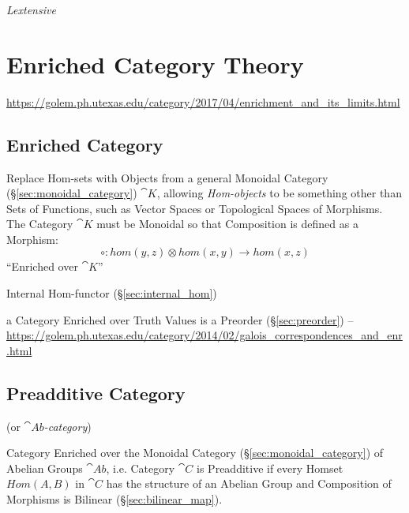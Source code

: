 \emph{Lextensive}



\section{Enriched Category Theory}\label{sec:enriched_category_theory}

\url{https://golem.ph.utexas.edu/category/2017/04/enrichment_and_its_limits.html}



\subsection{Enriched Category}\label{sec:enriched_category}

Replace Hom-sets with Objects from a general Monoidal Category
(\S\ref{sec:monoidal_category}) $\cat{K}$, allowing \emph{Hom-objects}
to be something other than Sets of Functions, such as Vector Spaces or
Topological Spaces of Morphisms. The Category $\cat{K}$ must be
Monoidal so that Composition is defined as a Morphism:
\[
  \circ : hom(y,z) \otimes hom(x,y) \rightarrow hom(x,z)
\]
``Enriched over $\cat{K}$''

Internal Hom-functor (\S\ref{sec:internal_hom})

a Category Enriched over Truth Values is a Preorder
(\S\ref{sec:preorder}) --
\url{https://golem.ph.utexas.edu/category/2014/02/galois_correspondences_and_enr.html}



\subsection{Preadditive Category}\label{sec:preadditive_category}

(or \emph{$\cat{Ab}$-category})

Category Enriched over the Monoidal Category
(\S\ref{sec:monoidal_category}) of Abelian Groups $\cat{Ab}$, i.e.
Category $\cat{C}$ is Preadditive if every Homset $Hom(A,B)$ in
$\cat{C}$ has the structure of an Abelian Group and Composition of
Morphisms is Bilinear (\S\ref{sec:bilinear_map}).



